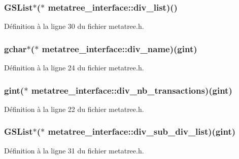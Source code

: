 \subsubsection[{div\_\-list}]{\setlength{\rightskip}{0pt plus 5cm}GSList$\ast$($\ast$  {\bf metatree\_\-interface::div\_\-list})()}\label{structmetatree__interface_a87b80fadda4471f348d694e972370042}


Définition à la ligne 30 du fichier metatree.h.

\subsubsection[{div\_\-name}]{\setlength{\rightskip}{0pt plus 5cm}gchar$\ast$($\ast$  {\bf metatree\_\-interface::div\_\-name})(gint)}\label{structmetatree__interface_afb9d91d292283c5250707d57139e3f60}


Définition à la ligne 24 du fichier metatree.h.

\subsubsection[{div\_\-nb\_\-transactions}]{\setlength{\rightskip}{0pt plus 5cm}gint($\ast$  {\bf metatree\_\-interface::div\_\-nb\_\-transactions})(gint)}\label{structmetatree__interface_ac0d8da7081759c07c196ef81f72b7a8b}


Définition à la ligne 22 du fichier metatree.h.

\subsubsection[{div\_\-sub\_\-div\_\-list}]{\setlength{\rightskip}{0pt plus 5cm}GSList$\ast$($\ast$  {\bf metatree\_\-interface::div\_\-sub\_\-div\_\-list})(gint)}\label{structmetatree__interface_a157c0657918bf598a401ea66b51200f1}


Définition à la ligne 31 du fichier metatree.h.


